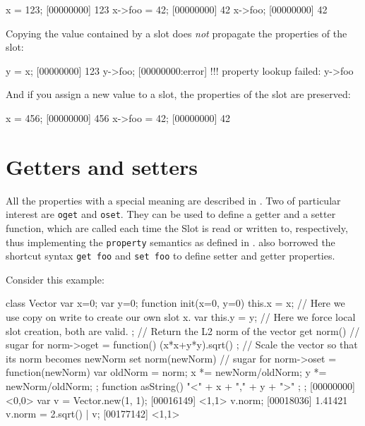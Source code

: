 \begin{urbiscript}
x = 123;
[00000000] 123
x->foo = 42;
[00000000] 42
x->foo;
[00000000] 42
\end{urbiscript}

Copying the value contained by a slot does \emph{not} propagate the
properties of the slot:

\begin{urbiscript}
y = x;
[00000000] 123
y->foo;
[00000000:error] !!! property lookup failed: y->foo
\end{urbiscript}

And if you assign a new value to a slot, the properties of the slot are
preserved:

\begin{urbiscript}
x = 456;
[00000000] 456
x->foo = 42;
[00000000] 42
\end{urbiscript}

\section{Getters and setters}
\label{sec:tut:getter}

All the properties with a special meaning are described in .
Two of particular interest are \lstinline{oget} and \lstinline{oset}. They can
be used to define a getter and a setter function, which are called each time
the Slot is read or written to, respectively, thus implementing the
\lstinline{property} semantics as defined in \Js. \us also borrowed the \Js
shortcut syntax \lstinline{get foo} and \lstinline{set foo} to define setter
and getter properties.

Consider this example:

\begin{urbiscript}
class Vector
{
  var x=0;
  var y=0;
  function init(x=0, y=0)
  {
    this.x = x; // Here we use copy on write to create our own slot x.
    var this.y = y; // Here we force local slot creation, both are valid.
  };
  // Return the L2 norm of the vector
  get norm() // sugar for norm->oget = function()
  {
    (x*x+y*y).sqrt()
  };
  // Scale the vector so that its norm becomes newNorm
  set norm(newNorm) // sugar for norm->oset = function(newNorm)
  {
    var oldNorm = norm;
    x *= newNorm/oldNorm;
    y *= newNorm/oldNorm;
  };
  function asString()
  {
    "<" + x + "," + y + ">"
  };
};
[00000000] <0,0>
var v = Vector.new(1, 1);
[00016149] <1,1>
v.norm;
[00018036] 1.41421
v.norm = 2.sqrt() | v;
[00177142] <1,1>
\end{urbiscript}

